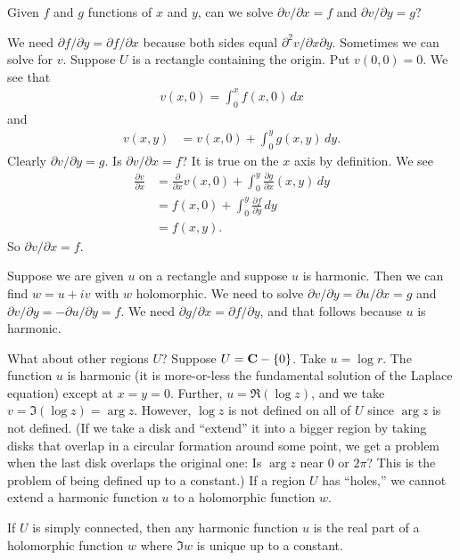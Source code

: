 \documentclass[11pt, oneside,margin=1in]{article}
\begin{document}
\begin{problem}
	Given $f$ and $g$ functions of $x$ and $y$, can we solve $\partial v/\partial x = f$ and $\partial v/\partial y = g$?
\end{problem}

We need $\partial f/\partial y = \partial f/\partial x$ because both sides equal $\partial^2 v/\partial x\partial y$. Sometimes we can solve for $v$. Suppose $U$ is a rectangle containing the origin. Put $v(0,0)=0$. We see that
\begin{align*}
	v(x,0) =  \int_{0}^{x} f(x,0)   \, dx 
\end{align*}
and
\begin{align*}
	v(x,y) &= v (x,0) +  \int_{0}^{y} g(x,y)  \, dy. 
\end{align*}
Clearly $\partial v/\partial y=g$. Is $\partial v/\partial x = f$? It is true on the $x$ axis by definition. We see
\begin{align*}
	\frac{\partial v}{\partial x} &= \frac{\partial}{\partial x} v(x,0) +  \int_{0}^{y} \frac{\partial g}{\partial x}(x,y)  \, dy\\
				      &= f(x,0) +  \int_{0}^{y} \frac{\partial f}{\partial y}  \, dy\\
				      &= f(x,y).
\end{align*}
So $\partial v/\partial x = f$.

Suppose we are given $u$ on a rectangle and suppose $u$ is harmonic. Then we can find $w=u+iv$ with $w$ holomorphic. We need to solve $\partial v/\partial y =\partial u /\partial x = g$ and $\partial v/\partial y = -\partial u/\partial y = f$. We need $\partial g/\partial x = \partial f/\partial y$, and that follows because $u$ is harmonic.

What about other regions $U$? Suppose $U = \mathbf C-\{0\}$. Take $u=\log r$. The function $u$ is harmonic (it is more-or-less the fundamental solution of the Laplace equation) except at $x=y=0$. Further, $u = \Re (\log z)$, and we take $v = \Im(\log z) = \arg z$. However, $\log z$ is not defined on all of $U$ since $\arg z$ is not defined. (If we take a disk and ``extend'' it into a bigger region by taking disks that overlap in a circular formation around some point, we get a problem when the last disk overlaps the original one: Is $\arg z$ near $0$ or $2\pi$? This is the problem of being defined up to a constant.) If a region $U$ has ``holes,'' we cannot extend a harmonic function $u$ to a holomorphic function $w$. 

If $U$ is simply connected, then any harmonic function $u$ is the real part of a holomorphic function $w$ where $\Im w$ is unique up to a constant.
\end{document}
